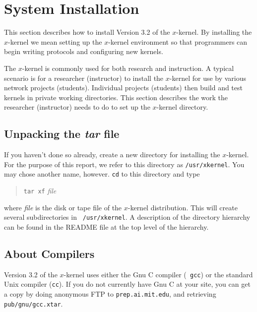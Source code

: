 % 
%
%
%
%
%

\section{System Installation}
\label{install}

This section describes how to install Version 3.2 of the $x$-kernel.
By installing the $x$-kernel we mean setting up the $x$-kernel
environment so that programmers can begin writing protocols and
configuring new kernels.

The $x$-kernel is commonly used for both research and instruction.  A
typical scenario is for a researcher (instructor) to install the
$x$-kernel for use by various network projects (students). Individual
projects (students) then build and test kernels in private working
directories. This section
describes the work the researcher (instructor) needs to do to set up
the $x$-kernel directory.  

\subsection{Unpacking the {\it tar} file}

If you haven't done so already, create a new directory for installing
the $x$-kernel.  For the purpose of this report, we refer to this
directory as {\tt /usr/xkernel}.  You may chose another name, however.
{\tt cd} to this directory and type

\begin{quote}
{\tt tar xf} {\it file}
\end{quote}

\noindent where {\it file} is the disk or tape file of the $x$-kernel
distribution. This will create several subdirectories in {\tt
/usr/xkernel}.  A description of the \xk{} directory hierarchy can be
found in the README file at the top level of the \xk{} hierarchy.


\subsection{About Compilers}

Version 3.2 of the $x$-kernel uses either the Gnu C compiler ({\tt
gcc}) or the standard Unix compiler ({\tt cc}).  If you do not
currently have Gnu C at your site, you can get a copy by doing
anonymous FTP to {\tt prep.ai.mit.edu}, and retrieving {\tt
pub/gnu/gcc.xtar}.

